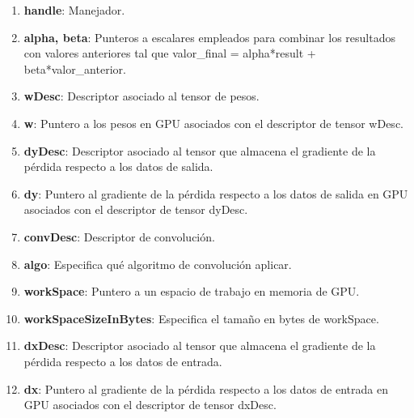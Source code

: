 \begin{enumerate}
	\item \textbf{handle}: Manejador.
	\item \textbf{alpha, beta}: Punteros a escalares empleados para combinar los resultados con valores anteriores tal que valor\_final = alpha*result + beta*valor\_anterior.
	\item \textbf{wDesc}: Descriptor asociado al tensor de pesos.
	\item \textbf{w}: Puntero a los pesos en GPU asociados con el descriptor de tensor wDesc.
	\item \textbf{dyDesc}: Descriptor asociado al tensor que almacena el gradiente de la pérdida respecto a los datos de salida.
	\item \textbf{dy}: Puntero al gradiente de la pérdida respecto a los datos de salida en GPU asociados con el descriptor de tensor dyDesc.
	\item \textbf{convDesc}: Descriptor de convolución.
	\item \textbf{algo}: Especifica qué algoritmo de convolución aplicar.
	\item \textbf{workSpace}: Puntero a un espacio de trabajo en memoria de GPU.
	\item \textbf{workSpaceSizeInBytes}: Especifica el tamaño en bytes de workSpace.
	\item \textbf{dxDesc}: Descriptor asociado al tensor que almacena el gradiente de la pérdida respecto a los datos de entrada.
	\item \textbf{dx}: Puntero al gradiente de la pérdida respecto a los datos de entrada en GPU asociados con el descriptor de tensor dxDesc.	
\end{enumerate}
\cite{cuDNN_conv_back_x}
